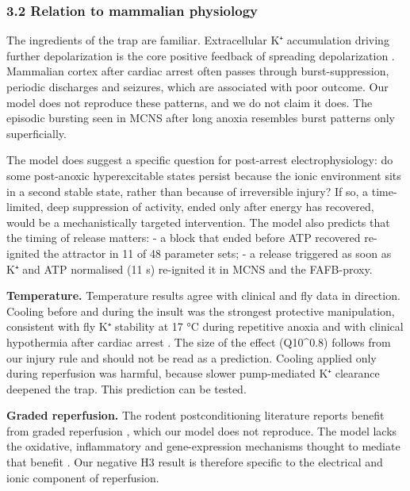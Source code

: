 \documentclass[11pt]{article}
\begin{document}
\subsubsection{3.2 Relation to mammalian physiology}\label{relation-to-mammalian-physiology}

The ingredients of the trap are familiar. Extracellular K⁺ accumulation driving further depolarization is the core positive feedback of spreading depolarization \cite{dreier2011,hartings2016}. Mammalian cortex after cardiac arrest often passes through burst-suppression, periodic discharges and seizures, which are associated with poor outcome. Our model does not reproduce these patterns, and we do not claim it does. The episodic bursting seen in MCNS after long anoxia resembles burst patterns only superficially.

The model does suggest a specific question for post-arrest electrophysiology: do some post-anoxic hyperexcitable states persist because the ionic environment sits in a second stable state, rather than because of irreversible injury? If so, a time-limited, deep suppression of activity, ended only after energy has recovered, would be a mechanistically targeted intervention. The model also predicts that the timing of release matters:
- a block that ended before ATP recovered re-ignited the attractor in 11 of 48 parameter sets;
- a release triggered as soon as K⁺ and ATP normalised (11 s) re-ignited it in MCNS and the FAFB-proxy.

\textbf{Temperature.} Temperature results agree with clinical and fly data in direction. Cooling before and during the insult was the strongest protective manipulation, consistent with fly K⁺ stability at 17 °C during repetitive anoxia \cite{rodriguez2012} and with clinical hypothermia after cardiac arrest \cite{haca2002,bernard2002,erecinska2003}. The size of the effect (Q10\^{}0.8) follows from our injury rule and should not be read as a prediction. Cooling applied only during reperfusion was harmful, because slower pump-mediated K⁺ clearance deepened the trap. This prediction can be tested.

\textbf{Graded reperfusion.} The rodent postconditioning literature reports benefit from graded reperfusion \cite{gao2008,zhao2009}, which our model does not reproduce. The model lacks the oxidative, inflammatory and gene-expression mechanisms thought to mediate that benefit \cite{eltzschig2011,caraballo2014,vigne2009}. Our negative H3 result is therefore specific to the electrical and ionic component of reperfusion.
\end{document}
